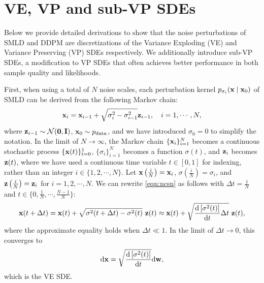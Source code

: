\section{VE, VP and sub-VP SDEs}\label{app:sde_derive}
Below we provide detailed derivations to show that the noise perturbations of SMLD and DDPM are discretizations of the Variance Exploding (VE) and Variance Preserving (VP) SDEs respectively. We additionally introduce sub-VP SDEs, a modification to VP SDEs that often achieves better performance in both sample quality and likelihoods.

First, when using a total of $N$ noise scales, each perturbation kernel $p_{\sigma_i}(\mathbf{x} \mid \mathbf{x}_0)$ of SMLD can be derived from the following Markov chain:
\begin{align}
\mathbf{x}_i = \mathbf{x}_{i-1} + \sqrt{\sigma_{i}^2 - \sigma_{i-1}^2} \mathbf{z}_{i-1}, \quad i=1,\cdots,N \label{eqn:ncsn},
\end{align}
where $\mathbf{z}_{i-1} \sim \mathcal{N}(\mathbf{0}, \mathbf{I})$, $\mathbf{x}_0 \sim p_\text{data}$, and we have introduced $\sigma_0 = 0$ to simplify the notation.
In the limit of $N \to \infty$, the Markov chain $\{\mathbf{x}_i\}_{i=1}^N$ becomes a continuous stochastic process $\{\mathbf{x}(t)\}_{t=0}^1$, $\{\sigma_i\}_{i=1}^N$ becomes a function $\sigma(t)$, and $\mathbf{z}_i$ becomes $\mathbf{z}(t)$, where we have used a continuous time variable $t \in [0, 1]$ for indexing, rather than an integer $i \in \{1, 2, \cdots, N\}$. 
Let $\mathbf{x}\left(\frac{i}{N}\right) = \mathbf{x}_i$, $\sigma\left(\frac{i}{N}\right) = \sigma_i$, and $\mathbf{z}\left(\frac{i}{N}\right) = \mathbf{z}_i$ for $i=1,2,\cdots, N$. We can rewrite \cref{eqn:ncsn} as follows with $\Delta t = \frac{1}{N}$ and $t \in \big\{0, \frac{1}{N}, \cdots, \frac{N-1}{N}\big\}$:
\begin{align*}
    \mathbf{x}(t + \Delta t) = \mathbf{x}(t) + \sqrt{\sigma^2(t + \Delta t)- \sigma^2(t)}~\mathbf{z}(t) \approx \mathbf{x}(t) + \sqrt{\frac{\mathrm{d} \left[ \sigma^2(t) \right] }{\mathrm{d} t}\Delta t} ~\mathbf{z}(t),
\end{align*}
where the approximate equality holds when $\Delta t \ll 1$. 
In the limit of $\Delta t \rightarrow 0$, this converges to
\begin{align}
\mathrm{d} \mathbf{x} = \sqrt{\frac{\mathrm{d} \left[ \sigma^2(t) \right]}{\mathrm{d} t}}\mathrm{d} \mathbf{w}, \label{eqn:ncsn_sde_2}
\end{align}
which is the VE SDE. %

